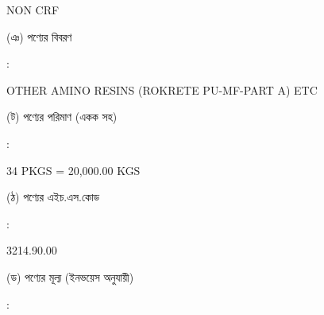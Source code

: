 \documentclass[12pt]{article}
\newcommand{\good}{OTHER AMINO RESINS (ROKRETE PU-MF-PART A) ETC}
\newcommand{\pkg}{34 PKGS = 20,000.00 KGS}
\newcommand{\crf}{NON CRF}
\newcommand{\crfdt}{}
\newcommand{\hscode}{3214.90.00}
\begin{document}
\begin{minipage}[t]{0.53\linewidth}
{\crf} \hspace{2em} {\crfdt}
\\
\end{minipage}
\begin{minipage}[t]{0.05\linewidth}
\hspace*{1em}
\end{minipage}
\begin{minipage}[t]{0.40\linewidth}
(ঞ) পণ্যের বিবরণ
\end{minipage}
\begin{minipage}[t]{0.02\linewidth}
:
\end{minipage}
\begin{minipage}[t]{0.53\linewidth}
{\good}
\\
\end{minipage}
\begin{minipage}[t]{0.05\linewidth}
\hspace*{1em}
\end{minipage}
\begin{minipage}[t]{0.40\linewidth}
(ট) পণ্যের পরিমাণ (একক সহ)
\end{minipage}
\begin{minipage}[t]{0.02\linewidth}
:
\end{minipage}
\begin{minipage}[t]{0.53\linewidth}
{\pkg}
\\
\end{minipage}
\begin{minipage}[t]{0.05\linewidth}
\hspace*{1em}
\end{minipage}
\begin{minipage}[t]{0.40\linewidth}
(ঠ) পণ্যের এইচ.এস.কোড
\end{minipage}
\begin{minipage}[t]{0.02\linewidth}
:
\end{minipage}
\begin{minipage}[t]{0.53\linewidth}
{\hscode}
\\
\end{minipage}
\begin{minipage}[t]{0.05\linewidth}
\hspace*{1em}
\end{minipage}
\begin{minipage}[t]{0.40\linewidth}
(ড) পণ্যের মূল্য (ইনভয়েস অনুযায়ী)
\end{minipage}
\begin{minipage}[t]{0.02\linewidth}
:
\end{minipage}
\end{document}
